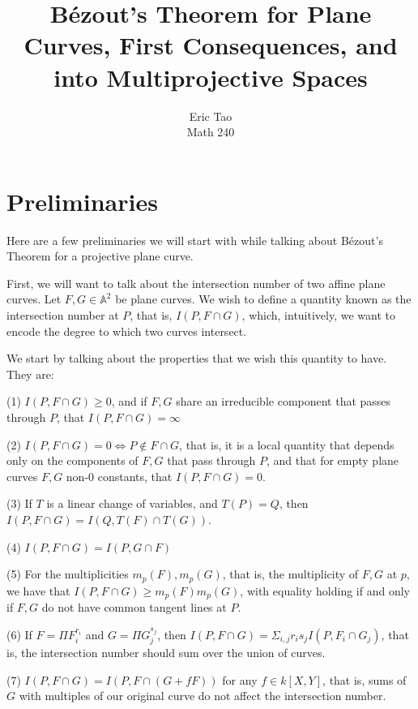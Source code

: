 \documentclass[10pt]{article}
\begin{document}
 
\title{B\'ezout’s Theorem for Plane Curves, First Consequences, and into Multiprojective Spaces}
\author{Eric Tao\\
Math 240}
\maketitle
 
\section{Preliminaries}

Here are a few preliminaries we will start with while talking about B\'ezout’s Theorem for a projective plane curve. 

First, we will want to talk about the intersection number of two affine plane curves. Let $F, G \in \mathbb{A}^2$ be plane curves. We wish to define a quantity known as the intersection number at $P$, that is, $I(P, F \cap G)$, which, intuitively, we want to encode the degree to which two curves intersect.

We start by talking about the properties that we wish this quantity to have. They are:

(1) $I(P, F \cap G) \geq 0$, and if $F, G$ share an irreducible component that passes through $P$, that $I(P, F \cap G) = \infty$

(2) $I(P, F \cap G) = 0 \iff P \not \in F \cap G$, that is, it is a local quantity that depends only on the components of $F,G$ that pass through $P$, and that for empty plane curves $F, G$ non-0 constants, that $I(P, F \cap G) = 0$.

(3) If $T$ is a linear change of variables, and $T(P) = Q$, then $I(P, F \cap G) = I(Q, T(F) \cap T(G))$.

(4) $I(P, F \cap G) = I(P, G \cap F)$

(5) For the multiplicities $m_p(F), m_p(G)$, that is, the multiplicity of $F,G$ at $p$, we have that $I(P, F \cap G) \geq m_p(F)m_p(G)$, with equality holding if and only if $F,G$ do not have common tangent lines at $P$.

(6) If $F = \Pi F_i^{r_i}$ and $G = \Pi G_j^{s_j}$, then $I(P, F \cap G) = \Sigma_{i,j} r_is_j I(P,F_i \cap G_j)$, that is, the intersection number should sum over the union of curves.

(7) $I(P, F \cap G) = I(P, F \cap (G + fF))$ for any $f \in k[X,Y]$, that is, sums of $G$ with multiples of our original curve do not affect the intersection number.
\end{document}
